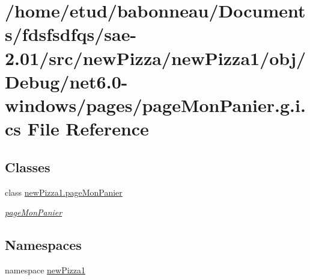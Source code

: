 \hypertarget{net6_80-windows_2pages_2pageMonPanier_8g_8i_8cs}{}\section{/home/etud/babonneau/\+Documents/fdsfsdfqs/sae-\/2.01/src/new\+Pizza/new\+Pizza1/obj/\+Debug/net6.0-\/windows/pages/page\+Mon\+Panier.g.\+i.\+cs File Reference}
\label{net6_80-windows_2pages_2pageMonPanier_8g_8i_8cs}
\subsection*{Classes}
\begin{DoxyCompactItemize}
\item 
class \hyperlink{classnewPizza1_1_1pageMonPanier}{new\+Pizza1.\+page\+Mon\+Panier}
\begin{DoxyCompactList}\small\item\em \hyperlink{classnewPizza1_1_1pageMonPanier}{page\+Mon\+Panier} \end{DoxyCompactList}\end{DoxyCompactItemize}
\subsection*{Namespaces}
\begin{DoxyCompactItemize}
\item 
namespace \hyperlink{namespacenewPizza1}{new\+Pizza1}
\end{DoxyCompactItemize}
